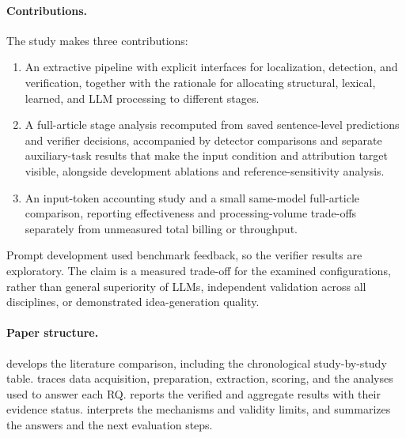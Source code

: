 \paragraph{Contributions.}
The study makes three contributions:
\begin{enumerate}
  \item An extractive pipeline with explicit interfaces for localization, detection, and
        verification, together with the rationale for allocating structural, lexical, learned,
        and LLM processing to different stages.
  \item A full-article stage analysis recomputed from saved sentence-level predictions and
        verifier decisions, accompanied by detector comparisons and separate auxiliary-task
        results that make the input condition and attribution target visible, alongside development
        ablations and reference-sensitivity analysis.
  \item An input-token accounting study and a small same-model full-article comparison,
        reporting effectiveness and processing-volume trade-offs separately from unmeasured
        total billing or throughput.
\end{enumerate}
Prompt development used benchmark feedback, so the verifier results are exploratory.
The claim is a measured trade-off for the examined configurations, rather than general superiority
of LLMs, independent validation across all disciplines, or demonstrated idea-generation quality.

\paragraph{Paper structure.}
 develops the literature comparison, including the chronological
study-by-study table.  traces data acquisition, preparation, extraction,
scoring, and the analyses used to answer each RQ.  reports the verified and
aggregate results with their evidence status.  interprets the mechanisms and
validity limits, and  summarizes the answers and the next evaluation steps.
